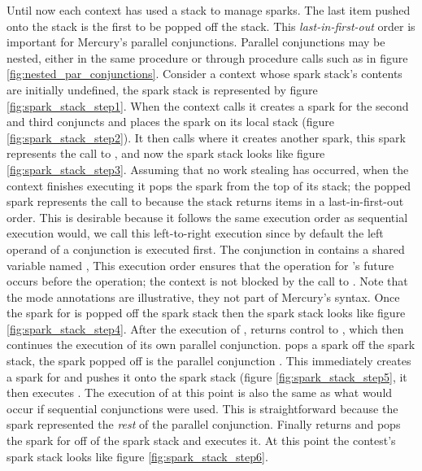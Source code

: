 Until now each context has used a stack to manage sparks.
The last item pushed onto the stack is the first to be popped off the
stack.
This \emph{last-in-first-out} order is important for Mercury's parallel
conjunctions.
Parallel conjunctions may be nested, either in the same procedure or through
procedure calls such as in figure
\ref{fig:nested_par_conjunctions}.
Consider a context whose spark stack's contents are initially undefined,
the spark stack is represented by
figure \ref{fig:spark_stack_step1}.
When the context calls  it creates a spark
for the second and third conjuncts 
and places the spark on its local stack (figure
\ref{fig:spark_stack_step2}).
It then calls  where it creates another spark,
this spark represents the call to ,
and now the spark stack looks like
figure \ref{fig:spark_stack_step3}.
Assuming that no work stealing has occurred,
when the context finishes executing  it pops the spark from the top
of its stack;
the popped spark represents the call to  because
the stack returns items in a last-in-first-out order.
This is desirable because it follows the same execution order as sequential
execution would,
we call this left-to-right execution since by default the left operand of a
conjunction is executed first.
The conjunction in  contains a shared variable named ,
This execution order ensures that the \signal operation for 's future
occurs before the \wait operation;
the context is not blocked by the call to \wait.
Note that the mode annotations are illustrative,
they not part of Mercury's syntax.
Once the spark for  is popped off the spark stack then the spark
stack looks like figure \ref{fig:spark_stack_step4}.
After the execution of ,  returns control to ,
which then continues the execution of its own parallel conjunction.
 pops a spark off the spark stack,
the spark popped off is the parallel conjunction
.
This immediately creates a spark for  and pushes it onto the spark
stack (figure \ref{fig:spark_stack_step5},
it then executes .
The execution of  at this point is also the same as what would occur
if sequential conjunctions were used.
This is straightforward because
the spark represented the \emph{rest} of the parallel
conjunction.
Finally  returns and  pops the spark for  off of the
spark stack and executes it.
At this point the contest's spark stack looks like figure
\ref{fig:spark_stack_step6}.

